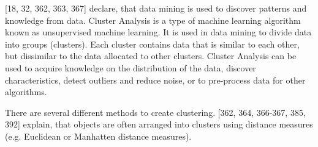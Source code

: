 




\textcite{han2011data}[18, 32, 362, 363, 367] declare, that data mining is used to discover patterns and knowledge from data.
Cluster Analysis is a type of machine learning algorithm known as unsupervised machine learning. It is used in data mining to divide data into groups (clusters). Each cluster contains data that is similar to each other, but dissimilar to the data allocated to other clusters. Cluster Analysis can be used to acquire knowledge on the distribution of the data, discover characteristics, detect outliers and reduce noise, or to pre-process data for other algorithms. 


There are several different methods to create clustering. \textcite{han2011data}[362, 364, 366-367, 385, 392] explain, that objects are often arranged into clusters using distance measures (e.g. Euclidean or Manhatten distance measures). 



